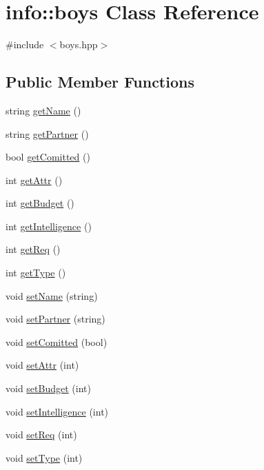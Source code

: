 \hypertarget{classinfo_1_1boys}{}\section{info\+:\+:boys Class Reference}
\label{classinfo_1_1boys}


{\ttfamily \#include $<$boys.\+hpp$>$}

\subsection*{Public Member Functions}
\begin{DoxyCompactItemize}
\item 
string \hyperlink{classinfo_1_1boys_a6ebb89c6a71963c24f85aa4789e04c56}{get\+Name} ()
\item 
string \hyperlink{classinfo_1_1boys_aea9ad23ef49edb4ba7b45579480eec3d}{get\+Partner} ()
\item 
bool \hyperlink{classinfo_1_1boys_a7e82f32eab921e9ddc0458aecc651029}{get\+Comitted} ()
\item 
int \hyperlink{classinfo_1_1boys_ab8a0f1fd17174e3043e10381d69e7422}{get\+Attr} ()
\item 
int \hyperlink{classinfo_1_1boys_af2916ef8a490e67d788f6dae2a1ed529}{get\+Budget} ()
\item 
int \hyperlink{classinfo_1_1boys_a592eb8062ee12ee15ee807b36b4baad7}{get\+Intelligence} ()
\item 
int \hyperlink{classinfo_1_1boys_abff3d8b445e7aebb10f091051d023eb7}{get\+Req} ()
\item 
int \hyperlink{classinfo_1_1boys_a2172ee66e4fa28da245fc8eecefa194e}{get\+Type} ()
\item 
void \hyperlink{classinfo_1_1boys_ad30696e57ed716b0ac4885ec78826627}{set\+Name} (string)
\item 
void \hyperlink{classinfo_1_1boys_a6fcb1c92050450e6ad5e821706422ed7}{set\+Partner} (string)
\item 
void \hyperlink{classinfo_1_1boys_a410e4f18f272e75d54586f2d889daec2}{set\+Comitted} (bool)
\item 
void \hyperlink{classinfo_1_1boys_a4eb5b0e932e25f506a6102d32e3356d2}{set\+Attr} (int)
\item 
void \hyperlink{classinfo_1_1boys_a01d82c9d3d673844086511abd78b7079}{set\+Budget} (int)
\item 
void \hyperlink{classinfo_1_1boys_a2423200cd79742193a482c3c190552ed}{set\+Intelligence} (int)
\item 
void \hyperlink{classinfo_1_1boys_ab5d3b0670e0b359c3eb8f7346e4feb92}{set\+Req} (int)
\item 
void \hyperlink{classinfo_1_1boys_acbe83b5a6db3fb6fde54f5b5d334278f}{set\+Type} (int)
\end{DoxyCompactItemize}
